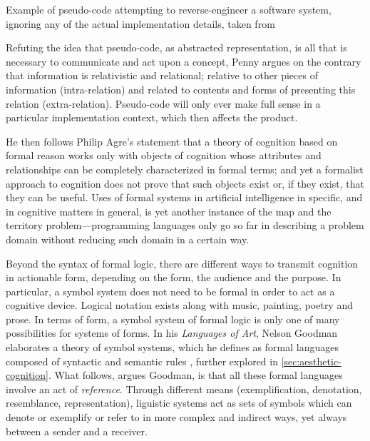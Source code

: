 \begin{listing}
    \inputminted{text}{./corpus/pseudocode.txt}
    \caption{Example of pseudo-code attempting to reverse-engineer a software system, ignoring any of the actual implementation details, taken from \citep{nielsen_working_2017}}
    \label{code:nielsen_chalktalk}
\end{listing}

Refuting the idea that pseudo-code, as abstracted representation, is all that is necessary to communicate and act upon a concept, Penny  argues on the contrary that information is relativistic and relational; relative to other pieces of information (intra-relation) and related to contents and forms of presenting this relation (extra-relation). Pseudo-code will only ever make full sense in a particular implementation context, which then affects the product.

He then follows Philip Agre's statement that a theory of cognition based on formal reason works only with objects of cognition whose attributes and relationships can be completely characterized in formal terms; and yet a formalist approach to cognition does not prove that such objects exist or, if they exist, that they can be useful. Uses of formal systems in artificial intelligence in specific, and in cognitive matters in general, is yet another instance of the map and the territory problem—programming languages only go so far in describing a problem domain without reducing such domain in a certain way.

Beyond the syntax of formal logic, there are different ways to transmit cognition in actionable form, depending on the form, the audience and the purpose. In particular, a symbol system does not need to be formal in order to act as a cognitive device. Logical notation exists along with music, painting, poetry and prose. In terms of form, a symbol system of formal logic is only one of many possibilities for systems of forms. In his \emph{Languages of Art}, Nelson Goodman elaborates a theory of symbol systems, which he defines as formal languages composed of syntactic and semantic rules \citep{goodman_languages_1976}, further explored in \ref{sec:aesthetic-cognition}. What follows, argues Goodman, is that all these formal languages involve an act of \emph{reference}. Through different means (exemplification, denotation, resemblance, representation), liguistic systems act as sets of symbols which can denote or exemplify or refer to in more complex and indirect ways, yet always between a sender and a receiver.

